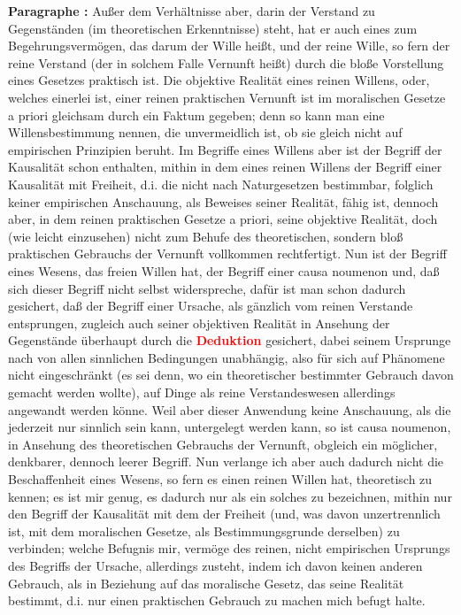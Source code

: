 \documentclass[a4paper,12pt,twoside]{book}
\newcommand{\match}[1]{\textcolor{red}{\textbf{#1}}}
\begin{document}
	\noindent\textbf{Paragraphe : }Außer dem Verhältnisse aber, darin der Verstand zu Gegenständen (im theoretischen Erkenntnisse) steht, hat er auch eines zum Begehrungsvermögen, das darum der Wille heißt, und der reine Wille, so fern der reine Verstand (der in solchem Falle Vernunft heißt) durch die bloße Vorstellung eines Gesetzes praktisch ist. Die objektive Realität eines reinen Willens, oder, welches einerlei ist, einer reinen praktischen Vernunft ist im moralischen Gesetze a priori gleichsam durch ein Faktum gegeben; denn so kann man eine Willensbestimmung nennen, die unvermeidlich ist, ob sie gleich nicht auf empirischen Prinzipien beruht. Im Begriffe eines Willens aber ist der Begriff der Kausalität schon enthalten, mithin in dem eines reinen Willens der Begriff einer Kausalität mit Freiheit, d.i. die nicht nach Naturgesetzen bestimmbar, folglich keiner empirischen Anschauung, als Beweises seiner Realität, fähig ist, dennoch aber, in dem reinen praktischen Gesetze a priori, seine objektive Realität, doch (wie leicht einzusehen) nicht zum Behufe des theoretischen, sondern bloß praktischen Gebrauchs der Vernunft vollkommen rechtfertigt. Nun ist der Begriff eines Wesens, das freien Willen hat, der Begriff einer causa noumenon und, daß sich dieser Begriff nicht selbst widerspreche, dafür ist man schon dadurch gesichert, daß der Begriff einer Ursache, als gänzlich vom reinen Verstande entsprungen, zugleich auch seiner objektiven Realität in Ansehung der Gegenstände überhaupt durch die \match{Deduktion} gesichert, dabei seinem Ursprunge nach von allen sinnlichen Bedingungen unabhängig, also für sich auf Phänomene nicht eingeschränkt (es sei denn, wo ein theoretischer bestimmter Gebrauch davon gemacht werden wollte), auf Dinge als reine Verstandeswesen allerdings angewandt werden könne. Weil aber dieser Anwendung keine Anschauung, als die jederzeit nur sinnlich sein kann, untergelegt werden kann, so ist causa noumenon, in Ansehung des theoretischen Gebrauchs der Vernunft, obgleich ein möglicher, denkbarer, dennoch leerer Begriff. Nun verlange ich aber auch dadurch nicht die Beschaffenheit eines Wesens, so fern es einen reinen Willen hat, theoretisch zu kennen; es ist mir genug, es dadurch nur als ein solches zu bezeichnen, mithin nur den Begriff der Kausalität mit dem der Freiheit (und, was davon unzertrennlich ist, mit dem moralischen Gesetze, als Bestimmungsgrunde derselben) zu verbinden; welche Befugnis mir, vermöge des reinen, nicht empirischen Ursprungs des Begriffs der Ursache, allerdings zusteht, indem ich davon keinen anderen Gebrauch, als in Beziehung auf das moralische Gesetz, das seine Realität bestimmt, d.i. nur einen praktischen Gebrauch zu machen mich befugt halte. 
	
\end{document}

